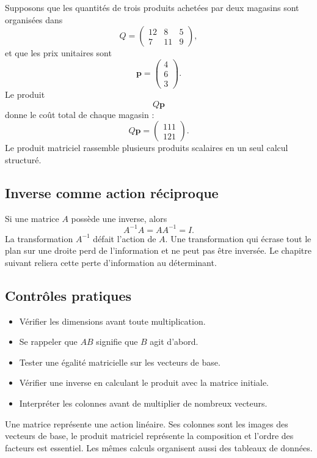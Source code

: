 \documentclass[12pt,a4paper,openany]{book}
\begin{document}
Supposons que les quantités de trois produits achetées par deux magasins sont organisées dans
\[
Q=\begin{pmatrix}12&8&5\\7&11&9\end{pmatrix},
\]
et que les prix unitaires sont
\[
\mathbf p=\begin{pmatrix}4\\6\\3\end{pmatrix}.
\]
Le produit
\[
Q\mathbf p
\]
donne le coût total de chaque magasin :
\[
Q\mathbf p=\begin{pmatrix}111\\121\end{pmatrix}.
\]
Le produit matriciel rassemble plusieurs produits scalaires en un seul calcul structuré.

\subsection{Inverse comme action réciproque}

Si une matrice $A$ possède une inverse, alors
\[
A^{-1}A=AA^{-1}=I.
\]
La transformation $A^{-1}$ défait l'action de $A$. Une transformation qui écrase tout le plan sur une droite perd de l'information et ne peut pas être inversée. Le chapitre suivant reliera cette perte d'information au déterminant.

\subsection{Contrôles pratiques}

\begin{itemize}
\item Vérifier les dimensions avant toute multiplication.
\item Se rappeler que $AB$ signifie que $B$ agit d'abord.
\item Tester une égalité matricielle sur les vecteurs de base.
\item Vérifier une inverse en calculant le produit avec la matrice initiale.
\item Interpréter les colonnes avant de multiplier de nombreux vecteurs.
\end{itemize}

\begin{summarybox}
Une matrice représente une action linéaire. Ses colonnes sont les images des vecteurs de base, le produit matriciel représente la composition et l'ordre des facteurs est essentiel. Les mêmes calculs organisent aussi des tableaux de données.
\end{summarybox}
\end{document}
